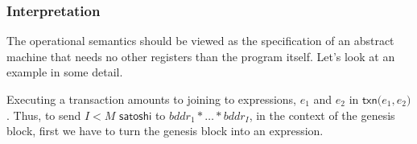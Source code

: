 \documentclass[]{acm_proc_article-sp}
\numberwithin{equation}{subsection}
\begin{document}
\begin{mathpar}
\end{mathpar}

\begin{mathpar}
\end{mathpar}

\begin{mathpar}
\end{mathpar}

\begin{mathpar}
\end{mathpar}

\subsubsection{Interpretation}

The operational semantics should be viewed as the specification of an
abstract machine that needs no other registers than the program
itself. Let's look at an example in some detail.

Executing a transaction amounts to joining to expressions, $e_1$ and
$e_2$ in $\mathsf{txn}\mathsf{(} e_1, e_2\mathsf{)}$. Thus, to send
$I < M$ $\mathsf{satoshi}$ to $bddr_1 * \ldots * bddr_I$, in the context of the genesis
block, first we have to turn the genesis block into an expression.
\end{document}
